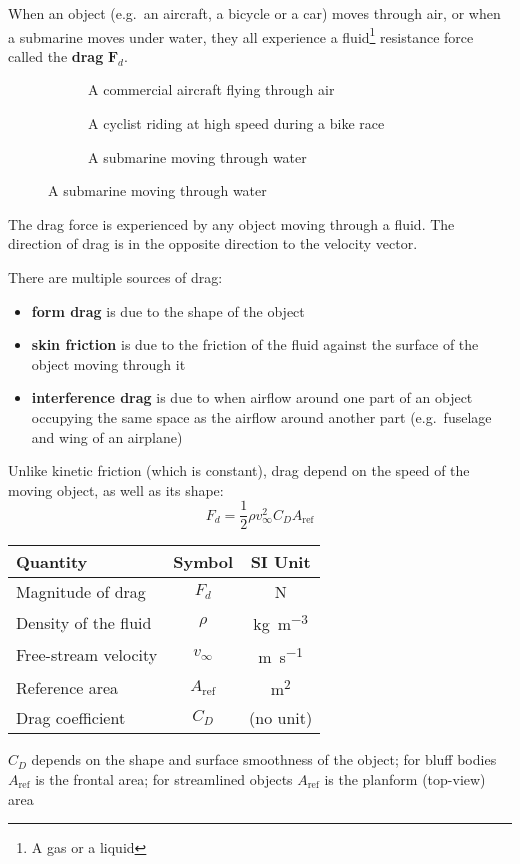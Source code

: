 When an object (e.g.\ an aircraft, a bicycle or a car) moves through air, or
when a submarine moves under water, they all experience a
fluid\footnote{A gas or a liquid} resistance force called the
\textbf{drag} $\bm F_d$.
\begin{figure}[ht]
  \centering
  \begin{subfigure}{.338\textwidth}
    \caption{A commercial aircraft flying through air}
  \end{subfigure}
  \begin{subfigure}{.35\textwidth}
    \caption{A cyclist riding at high speed during a bike race}
  \end{subfigure}
  \begin{subfigure}{.263\textwidth}
    \caption{A submarine moving through water}
  \end{subfigure}
\end{figure}
The drag force is experienced by any object moving through a fluid. The
direction of drag is in the opposite direction to the velocity vector.

There are multiple sources of drag:
\begin{itemize}
\item\textbf{form drag} is due to the shape of the object
\item\textbf{skin friction} is due to the friction of the fluid against
  the surface of the object moving through it
\item\textbf{interference drag} is due to when airflow around one part of
  an object occupying the same space as the airflow around another part
  (e.g.\ fuselage and wing of an airplane)
\end{itemize}

Unlike kinetic friction (which is constant), drag depend on the speed of the
moving object, as well as its shape:
\begin{equation}
  \boxed{
    F_d=\frac12\rho v_\infty^2C_DA_\text{ref}
  }
\end{equation}
\begin{center}
  \begin{tabular}{l|c|c}
    \rowcolor{pink}
    \textbf{Quantity} & \textbf{Symbol} & \textbf{SI Unit} \\ \hline
    Magnitude of drag       & $F_d$     & \si\newton \\
    Density of the fluid    & $\rho$    & \si{\kilo\gram\per\metre\cubed}\\
    Free-stream velocity    & $v_\infty$ & \si{\metre\per\second} \\
    Reference area          & $A_\text{ref}$ & \si{\metre\squared} \\
    Drag coefficient        & $C_D$     & (no unit)
  \end{tabular}
\end{center}
$C_D$ depends on the shape and surface smoothness of the object; for bluff
bodies $A_\text{ref}$ is the frontal area; for streamlined objects
$A_\text{ref}$ is the planform (top-view) area




